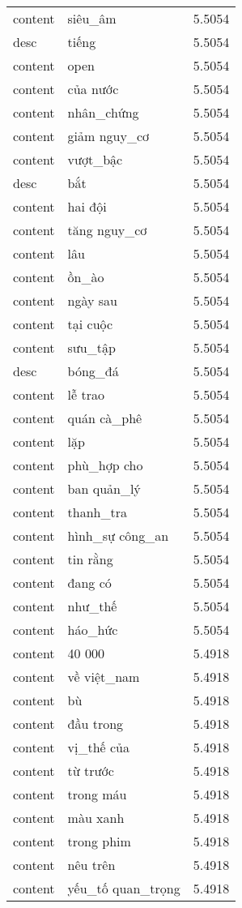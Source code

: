 \documentclass{article}
\begin{document}
\begin{tabular}{lll}
content & siêu\_âm & 5.5054\\
desc & tiếng & 5.5054\\
content & open & 5.5054\\
content & của nước & 5.5054\\
content & nhân\_chứng & 5.5054\\
content & giảm nguy\_cơ & 5.5054\\
content & vượt\_bậc & 5.5054\\
desc & bắt & 5.5054\\
content & hai đội & 5.5054\\
content & tăng nguy\_cơ & 5.5054\\
content & lâu & 5.5054\\
content & ồn\_ào & 5.5054\\
content & ngày sau & 5.5054\\
content & tại cuộc & 5.5054\\
content & sưu\_tập & 5.5054\\
desc & bóng\_đá & 5.5054\\
content & lễ trao & 5.5054\\
content & quán cà\_phê & 5.5054\\
content & lặp & 5.5054\\
content & phù\_hợp cho & 5.5054\\
content & ban quản\_lý & 5.5054\\
content & thanh\_tra & 5.5054\\
content & hình\_sự công\_an & 5.5054\\
content & tin rằng & 5.5054\\
content & đang có & 5.5054\\
content & như\_thế & 5.5054\\
content & háo\_hức & 5.5054\\
content & 40 000 & 5.4918\\
content & về việt\_nam & 5.4918\\
content & bù & 5.4918\\
content & đầu trong & 5.4918\\
content & vị\_thế của & 5.4918\\
content & từ trước & 5.4918\\
content & trong máu & 5.4918\\
content & màu xanh & 5.4918\\
content & trong phim & 5.4918\\
content & nêu trên & 5.4918\\
content & yếu\_tố quan\_trọng & 5.4918\\

\end{tabular}
\end{document}
